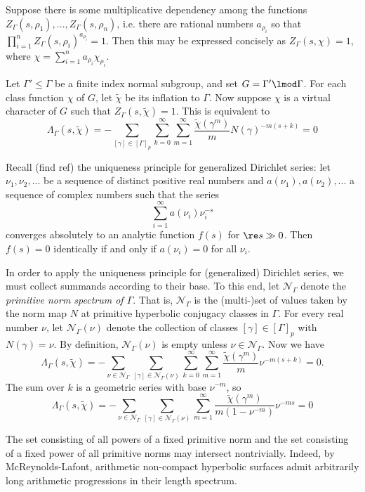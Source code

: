 \documentclass[11pt]{amsart}
\theoremstyle{definition}
\theoremstyle{plain}
\theoremstyle{remark}
\begin{document}
Suppose there is some multiplicative dependency among the functions $Z_\Gamma(s,\rho_1),...,Z_\Gamma(s,\rho_n)$, i.e.
there are rational numbers $a_{\rho_i}$ so that $\prod_{i=1}^n Z_\Gamma(s,\rho_i)^{a_{\rho_i}}=1$.
Then this may be expressed concisely as $Z_\Gamma(s,\chi)=1$, where $\chi=\sum_{i=1}^n a_{\rho_i} \chi_{\rho_i}$.

Let $\Gamma'\leq \Gamma$ be a finite index normal subgroup, and set $G=\Gamma'\lmod \Gamma$.
For each class function $\chi$ of $G$, let $\tilde{\chi}$ be its inflation to $\Gamma$.
Now suppose $\chi$ is a virtual character of $G$ such that $Z_\Gamma(s,\tilde{\chi})=1$.
This is equivalent to
\[ \Lambda_\Gamma(s,\tilde{\chi})= -\sum_{[\gamma]\in [\Gamma]_p} \sum_{k=0}^\infty\sum_{m=1}^\infty \frac{\tilde{\chi}(\gamma^m)}{m}N(\gamma)^{-m(s+k)}=0 \]

Recall (find ref) the uniqueness principle for generalized Dirichlet series: let $\nu_1, \nu_2,...$ be a sequence of distinct positive real numbers and $a(\nu_1),a(\nu_2),...$ a sequence of complex numbers such that the series
\[ \sum_{i=1}^\infty a(\nu_i)\nu_i^{-s}\]
converges absolutely to an analytic function $f(s)$ for $\re s \gg 0$.
Then $f(s)=0$ identically if and only if $a(\nu_i)=0$ for all $\nu_i$.


In order to apply the uniqueness principle for (generalized) Dirichlet series, we must collect summands according to their base.
To this end, let $\mathcal{N}_\Gamma$ denote the \emph{primitive norm spectrum of $\Gamma$}.
That is, $\mathcal{N}_\Gamma$ is the (multi-)set of values taken by the norm map $N$ at primitive hyperbolic conjugacy classes in $\Gamma$.
For every real number $\nu$, let $\mathcal{N}_\Gamma(\nu)$ denote the collection of classes $[\gamma] \in [\Gamma]_p$ with $N(\gamma)=\nu$.
By definition, $\mathcal{N}_\Gamma(\nu)$ is empty unless $\nu \in \mathcal{N}_\Gamma$.
Now we have
\[ \Lambda_\Gamma(s,\tilde{\chi})=-\sum_{\nu \in \mathcal{N}_\Gamma} \sum_{[\gamma] \in \mathcal{N}_\Gamma(\nu)} \sum_{k=0}^\infty\sum_{m=1}^\infty \frac{\tilde{\chi}(\gamma^m)}{m}\nu ^{-m(s+k)}=0.
\]
The sum over $k$ is a geometric series with base $\nu^{-m}$, so
\[ \Lambda_\Gamma(s,\tilde{\chi})=-\sum_{\nu \in \mathcal{N}_\Gamma} \sum_{[\gamma] \in \mathcal{N}_\Gamma(\nu)} \sum_{m=1}^\infty \frac{\tilde{\chi}(\gamma^m)}{m(1-\nu^{-m})}\nu ^{-ms}=0  \]

The set consisting of all powers of a fixed primitive norm and the set consisting of a fixed power of all primitive norms may intersect nontrivially.
Indeed, by McReynolds-Lafont, arithmetic non-compact hyperbolic surfaces admit arbitrarily long arithmetic progressions in their length spectrum.
\end{document}

